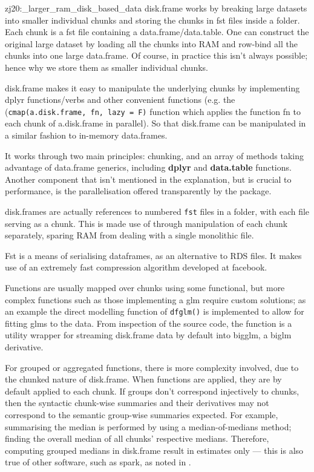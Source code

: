 \documentclass[a4paper,10pt]{article}
\begin{document}
\begin{displaycquote}{zj20:_larger_ram_disk_based_data}
        {disk.frame} works by breaking large datasets into smaller
        individual chunks and storing the chunks in fst files inside a
        folder. Each chunk is a fst file containing a data.frame/data.table.
        One can construct the original large dataset by loading all the
        chunks into RAM and row-bind all the chunks into one large
        data.frame. Of course, in practice this isn't always possible; hence
        why we store them as smaller individual chunks.

                {disk.frame} makes it easy to manipulate the underlying chunks by
        implementing dplyr functions/verbs and other convenient functions
        (e.g. the (\texttt{cmap(a.disk.frame, fn, lazy = F)} function which
        applies the function fn to each chunk of a.disk.frame in parallel).
        So that {disk.frame} can be manipulated in a similar fashion to
        in-memory data.frames.
\end{displaycquote}

It works through two main principles: chunking, and an array of methods taking advantage of data.frame generics, including \textbf{dplyr} and \textbf{data.table} functions. 
Another component that isn't mentioned in the explanation, but is crucial to performance, is the parallelisation offered transparently by the package.

disk.frames are actually references to numbered \texttt{fst} files in a folder, with each file serving as a chunk. 
This is made use of through manipulation of each chunk separately, sparing RAM from dealing with a single monolithic file\cite{zj19:_inges_data}.

Fst is a means of serialising dataframes, as an alternative to RDS files\cite{klik19}. 
It makes use of an extremely fast compression algorithm developed at facebook.

Functions are usually mapped over chunks using some functional, but more complex functions such as those implementing a glm require custom solutions; as an example the direct modelling function of \texttt{dfglm()} is implemented to allow for fitting glms to the data. 
From inspection of the source code, the function is a utility wrapper for streaming disk.frame data by default into bigglm, a biglm derivative.

For grouped or aggregated functions, there is more complexity involved, due to the chunked nature of disk.frame. 
When functions are applied, they are by default applied to each chunk. 
If groups don't correspond injectively to chunks, then the syntactic chunk-wise summaries and their derivatives may not correspond to the semantic group-wise summaries expected. 
For example, summarising the median is performed by using a median-of-medians method; finding the overall median of all chunks' respective medians. 
Therefore, computing grouped medians in disk.frame result in estimates only --- this is also true of other software, such as spark, as noted in \textcite{zj19:_group_by}.
\end{document}
